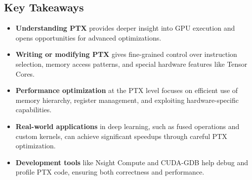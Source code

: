 \subsection{Key Takeaways}

\begin{itemize}
    \item \textbf{Understanding PTX} provides deeper insight into GPU execution and opens opportunities for advanced optimizations.

    \item \textbf{Writing or modifying PTX} gives fine-grained control over instruction selection, memory access patterns, and special hardware features like Tensor Cores.

    \item \textbf{Performance optimization} at the PTX level focuses on efficient use of memory hierarchy, register management, and exploiting hardware-specific capabilities.

    \item \textbf{Real-world applications} in deep learning, such as fused operations and custom kernels, can achieve significant speedups through careful PTX optimization.

    \item \textbf{Development tools} like Nsight Compute and CUDA-GDB help debug and profile PTX code, ensuring both correctness and performance.
\end{itemize}

